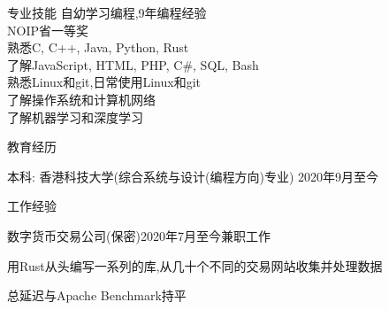 \documentclass[UTF8]{resume} %
\begin{document}
\begin{rSection}{专业技能}
    自幼学习编程,9年编程经验\\
    NOIP省一等奖\\
    熟悉C, C++, Java, Python, Rust\\
    了解JavaScript, HTML, PHP, C\#, SQL, Bash\\
    熟悉Linux和git,日常使用Linux和git\\
    了解操作系统和计算机网络\\
    了解机器学习和深度学习
\end{rSection}

\begin{rSection}{教育经历}
    
    本科: 香港科技大学(综合系统与设计(编程方向)专业) \hfill 2020年9月至今\\
    
\end{rSection}

\begin{rSection}{工作经验}
    \begin{rSubsection}{数字货币交易公司(保密)}{2020年7月至今}{兼职工作}{}
        \item 用Rust从头编写一系列的库,从几十个不同的交易网站收集并处理数据
        \item 总延迟与Apache Benchmark持平
    \end{rSubsection}
\end{rSection}
\end{document}
